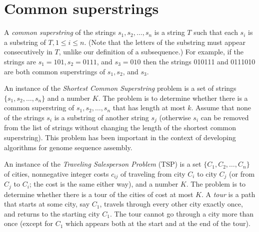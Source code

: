 \documentclass[11pt]{article}
\begin{document}
\section{Common superstrings}
\label{sec-3}
A \emph{common superstring} of the strings $s_1, s_2, \ldots, s_n$ is a
string $T$ such that each $s_i$ is a substring of $T, 1 \le i \le
n$. (Note that the letters of the substring must appear consecutively in
$T$, unlike our definition of a subsequence.) For example, if the
strings are $s_1 = 101, s_2 = 0111$, and $s_3 = 010$ then the strings
010111 and 0111010 are both common superstrings of $s_1, s_2$, and
$s_3$.  

An instance of the \emph{Shortest Common Superstring} problem is a set of
strings $\{s_1, s_2, \ldots, s_n\}$ and a number $K$.
The problem is to determine whether there is a
common superstring of $s_1, s_2, \ldots, s_n$ that has length at most
$k$.  Assume that none of the strings $s_i$ is a substring of another
string $s_j$ (otherwise $s_i$ can be removed from the list of strings
without changing the length of the shortest common superstring). This
problem has been important in the context of developing algorithms for
genome sequence assembly.

An instance of the \emph{Traveling Salesperson Problem} (TSP) is a set $\{
C_1, C_2, \ldots, C_n \}$ of cities, nonnegative integer costs
$c_{ij}$ of traveling from city $C_i$ to city $C_j$ (or from $C_j$ to
$C_i$; the cost is the same either way), and a number $K$.  The
problem is to determine whether there is a tour of the cities of cost
at most $K$.  A \emph{tour} is a path that starts at some city, say $C_1$,
travels through every other city exactly once, and returns to the
starting city $C_1$. The tour cannot go through a city more than once
(except for $C_1$ which appears both at the start and at the end of
the tour).
\end{document}

